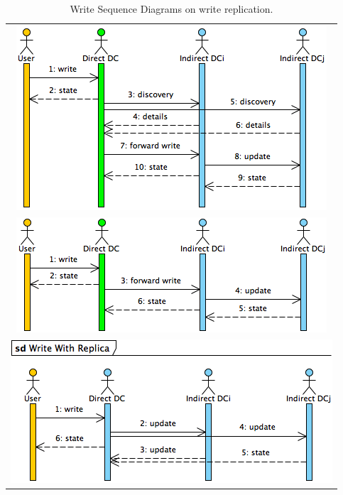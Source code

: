 \documentclass[english]{article}
\begin{document}
\begin{table}[htpb!]
	\begin{center}
		\begin{tabular}{c}
			\includegraphics[width=.94\textwidth]{figures/firstWriteWithoutReplica.png} \\
			\includegraphics[width=.96\textwidth]{figures/writeWithoutReplica.png} \\
			\includegraphics[width=.96\textwidth]{figures/writeWithReplica.png}
		\end{tabular}
		
		\caption{Write Sequence Diagrams on write replication.}
		\label{tb:write_sequence_diagrams}
	\end{center}
\end{table}
\end{document}
